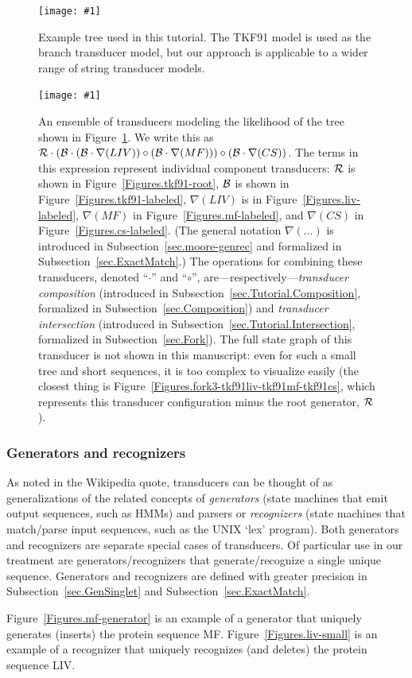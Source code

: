 \documentclass{article}
\newcommand{\secref}[1]{Subsection~\ref{sec.#1}}
\newcommand{\figref}[1]{Figure~\ref{Figures.#1}}
\newcommand{\figlabel}[1]{\label{Figures.#1}}
\newcommand{\easyfig}[4]{
\begin{figure}
\texttt{[image: \#1]}
\caption{ \figlabel{#3} #4}
\end{figure}}
\newcommand{\pdffig}[2]{\easyfig{#1-fig.pdf}{}{#1}{#2}}
\newcommand\tkf{{\cal B}}
\newcommand\tkfroot{{\cal R}}
\newcommand\fork{\circ}
\newcommand\recognize{\nabla}
\begin{document}
\pdffig{cs-mf-liv-tree}{Example tree used in this tutorial.  
The TKF91 model is used as the branch transducer model, but our approach 
is applicable to a wider range of string transducer models.  }

\pdffig{cs-mf-liv-machines}{An ensemble of transducers modeling the likelihood of the tree shown in \figref{cs-mf-liv-tree}.
We write this as $\tkfroot \cdot (\tkf \cdot (\tkf \cdot \recognize(LIV))\fork(\tkf \cdot \recognize(MF)))\fork(\tkf \cdot \recognize(CS))$.
The terms in this expression represent individual component transducers:
$\tkfroot$ is shown in \figref{tkf91-root},
$\tkf$ is shown in \figref{tkf91-labeled},
$\recognize(LIV)$ is in \figref{liv-labeled},
$\recognize(MF)$ in \figref{mf-labeled},
 and
$\recognize(CS)$ in \figref{cs-labeled}.
(The general notation $\recognize(\ldots)$ is
introduced in \secref{moore-genrec} and
formalized in \secref{ExactMatch}.)
The operations for combining these transducers, denoted ``$\cdot$'' and ``$\fork$'',
are---respectively---{\em transducer composition}
(introduced in \secref{Tutorial.Composition}, formalized in \secref{Composition})
and {\em transducer intersection}
(introduced in \secref{Tutorial.Intersection}, formalized in \secref{Fork}).
The full state graph of this transducer is not shown in this manuscript:
even for such a small tree and short sequences, it is too complex to visualize easily
(the closest thing is \figref{fork3-tkf91liv-tkf91mf-tkf91cs},
which represents this transducer configuration minus the root generator, $\tkfroot$).
 }

\subsubsection{Generators and recognizers}

As noted in the Wikipedia quote, transducers can be thought of as generalizations of the related
concepts of {\em generators} (state machines that emit output sequences, such as HMMs)
and parsers or {\em recognizers} (state machines that match/parse input sequences, such as the UNIX `lex' program).
Both generators and recognizers are separate special cases of transducers.
Of particular use in our treatment are generators/recognizers that generate/recognize a single unique sequence.
Generators and recognizers are defined with greater precision in \secref{GenSinglet} and \secref{ExactMatch}.


\figref{mf-generator} is an example of a generator that uniquely generates (inserts) the protein sequence MF.
\figref{liv-small} is an example of a recognizer that uniquely recognizes (and deletes) the protein sequence LIV.
\end{document}
